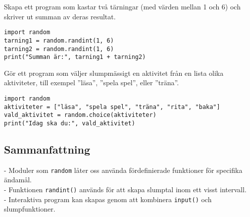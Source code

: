 \begin{exercise}
Skapa ett program som kastar två tärningar (med värden mellan 1 och 6) och skriver ut summan av deras resultat.
\end{exercise}

\begin{solution}
\begin{lstlisting}
import random
tarning1 = random.randint(1, 6)
tarning2 = random.randint(1, 6)
print("Summan är:", tarning1 + tarning2)
\end{lstlisting}
\end{solution}

\begin{exercise}
Gör ett program som väljer slumpmässigt en aktivitet från en lista olika aktiviteter, till exempel ''läsa'', ''spela spel'', eller ''träna''.
\end{exercise}

\begin{solution}
\begin{lstlisting}
import random
aktiviteter = ["läsa", "spela spel", "träna", "rita", "baka"]
vald_aktivitet = random.choice(aktiviteter)
print("Idag ska du:", vald_aktivitet)
\end{lstlisting}
\end{solution}

\subsection{Sammanfattning}
- Moduler som \texttt{random} låter oss använda fördefinierade funktioner för specifika ändamål.  \\
- Funktionen \texttt{randint()} används för att skapa slumptal inom ett visst intervall.  \\
- Interaktiva program kan skapas genom att kombinera \texttt{input()} och slumpfunktioner.\\

